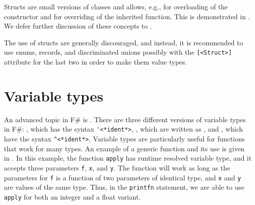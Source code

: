 Structs are small versions of classes and allows, e.g., for overloading of the  constructor and for overriding of the inherited  function. This is demonstrated in .
%
%
We defer further discussion of these concepts to .

The use of structs are generally discouraged, and instead, it is recommended to use enums, records, and discriminated unions possibly with the \lstinline{[<Struct>]} attribute for the last two in order to make them value types.

\section{Variable types}
\label{sec:variableTypes}
An advanced topic in F\# is . There are three different versions of variable types in F\#: , which has the syntax \lstinline[language=syntax]{'<*ident*>}, , which are written as \idx[_@\lstinline{_}]{\lexeme{_}}, and , which have the syntax \lstinline[language=syntax]{^<*ident*>}. Variable types are particularly useful for functions that work for many types.  An example of a generic function and its use is given in .
%
%
In this example, the function \lstinline{apply} has runtime resolved variable type, and it accepts three parameters \lstinline{f}, \lstinline{x}, and \lstinline{y}. The function will work as long as the parameters for \lstinline{f} is a function of two parameters of identical type, and \lstinline{x} and \lstinline{y} are values of the same type. Thus, in the \lstinline{printfn} statement, we are able to use \lstinline{apply} for both an integer and a float variant.

